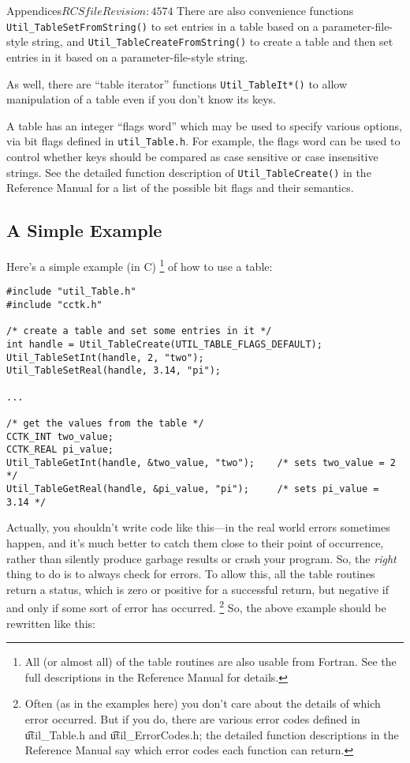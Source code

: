 \begin{cactuspart}{Appendices}{$RCSfile$}{$Revision: 4574 $}
There are also convenience functions \verb|Util_TableSetFromString()|
to set entries in a table based on a parameter-file-style string,
and \verb|Util_TableCreateFromString()| to create a table and then
set entries in it based on a parameter-file-style string.

As well, there are ``table iterator'' functions \verb|Util_TableIt*()|
to allow manipulation of a table even if you don't know its keys.

A table has an integer ``flags word'' which may be used to specify
various options, via bit flags defined in \verb|util_Table.h|.
For example, the flags word can be used to control whether keys
should be compared as case sensitive or case insensitive strings.
See the detailed function description of \verb|Util_TableCreate()|
in the Reference Manual for a list
of the possible bit flags and their semantics.


\subsection{A Simple Example}
\label{Tables_Simple_Example}

Here's a simple example (in C)%
\footnote{%
	 All (or almost all) of the table routines
	 are also usable from Fortran.  See the full
	 descriptions in the Reference Manual
	 for details.
	 }%
{} of how to use a table:
\begin{verbatim}
#include "util_Table.h"
#include "cctk.h"

/* create a table and set some entries in it */
int handle = Util_TableCreate(UTIL_TABLE_FLAGS_DEFAULT);
Util_TableSetInt(handle, 2, "two");
Util_TableSetReal(handle, 3.14, "pi");

...

/* get the values from the table */
CCTK_INT two_value;
CCTK_REAL pi_value;
Util_TableGetInt(handle, &two_value, "two");    /* sets two_value = 2 */
Util_TableGetReal(handle, &pi_value, "pi");     /* sets pi_value = 3.14 */
\end{verbatim}

Actually, you shouldn't write code like this---in the real world
errors sometimes happen, and it's much better to catch them close to
their point of occurrence, rather than silently produce garbage results
or crash your program.  So, the \emph{right} thing to do is to always
check for errors.  To allow this, all the table routines return a status,
which is zero or positive for a successful return, but negative if
and only if some sort of error has occurred.%
\footnote{%
	 Often (as in the examples here) you don't care
	 about the details of which error occurred.  But if
	 you do, there are various error codes defined in
	 {\t util\_Table.h} and {\t util\_ErrorCodes.h};
	 the detailed function descriptions in
	 the Reference Manual
	 say which error codes each function can return.
	 }%
{}  So, the above example should be rewritten like this:


\end{cactuspart}
